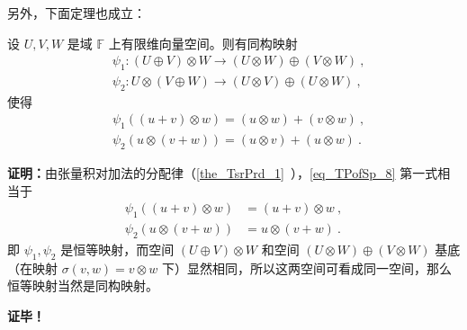 另外，下面定理也成立：
\begin{theorem}{}
设 $U,V,W$ 是域 $\mathbb F$ 上有限维向量空间。则有同构映射
\begin{equation}
\begin{aligned}
&\psi_1:(U\oplus V)\otimes W\rightarrow (U\otimes W)\oplus (V\otimes W) ~,\\
&\psi_2:U\otimes(V\oplus W)\rightarrow (U\otimes V)\oplus (U\otimes W)~,
\end{aligned}
\end{equation}
使得
\begin{equation}\label{eq_TPofSp_8}
\begin{aligned}
&\psi_1((u+v)\otimes w)=(u\otimes w)+ (v\otimes w)~,\\
&\psi_2(u\otimes (v+ w))=(u\otimes v)+ (u\otimes w) ~.
\end{aligned}
\end{equation}
\end{theorem}
\textbf{证明：}由张量积对加法的分配律（\autoref{the_TsrPrd_1}~），\autoref{eq_TPofSp_8} 第一式相当于
\begin{equation}
\begin{aligned}
\psi_1((u+v)\otimes w)&=(u+v)\otimes w~,\\
\psi_2(u\otimes(v+w))&=u\otimes(v+w)~.
\end{aligned}
\end{equation}
即 $\psi_1,\psi_2$ 是恒等映射，而空间 $(U\oplus V)\otimes W$ 和空间 $(U\otimes W)\oplus (V\otimes W) $ 基底（在映射 $\sigma(v,w)=v\otimes w$ 下）显然相同，所以这两空间可看成同一空间，那么恒等映射当然是同构映射。

\textbf{证毕！}

